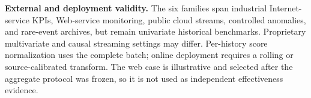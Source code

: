 \textbf{External and deployment validity.}
The six families span industrial Internet-service KPIs, Web-service monitoring, public cloud streams, controlled anomalies, and rare-event archives, but remain univariate historical benchmarks. Proprietary multivariate and causal streaming settings may differ. Per-history score normalization uses the complete batch; online deployment requires a rolling or source-calibrated transform. The web case is illustrative and selected after the aggregate protocol was frozen, so it is not used as independent effectiveness evidence.

